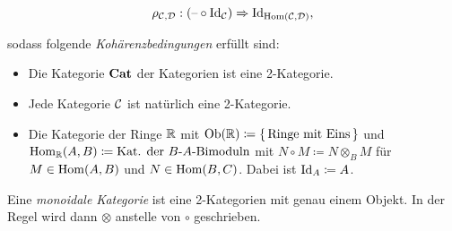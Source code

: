 \documentclass{cheat-sheet}
\newenvironment{centertikzcd}
  {\begin{center}\begin{tikzcd}}
  {\end{tikzcd}\end{center}}
\begin{document}
\begin{defn}
\begin{itemize}
\[      \rho_{\mathcal{C}, \mathcal{D}} : (\text{--} \circ \operatorname{Id}_{\mathcal{C}}) \Rightarrow \operatorname{Id}_{\operatorname{Hom}(\mathcal{C}, \mathcal{D})},
    \]
  \end{itemize}
  sodass folgende \emph{Kohärenzbedingungen} erfüllt sind:
\end{defn}


\begin{bspe}
  \begin{itemize}
    \item Die Kategorie $\mathbf{Cat}$ der Kategorien ist eine 2-Kategorie.
    \item Jede Kategorie $\mathcal{C}$ ist natürlich eine 2-Kategorie.
    \item Die Kategorie der Ringe $\mathbb{R}$ mit $\operatorname{Ob}(\mathbb{R}) \coloneqq \{ \, \text{Ringe mit Eins} \, \}$ und $\operatorname{Hom}_{\mathbb{R}}(A, B) \coloneqq \text{Kat. der $B$-$A$-Bimoduln}$ mit $N \circ M \coloneqq N \otimes_B M$ für $M \in \operatorname{Hom}(A, B)$ und $N \in \operatorname{Hom}(B, C)$. Dabei ist $\operatorname{Id}_A \coloneqq A$. %
  \end{itemize}
\end{bspe}

\begin{defn}
  Eine \emph{monoidale Kategorie} ist eine 2-Kategorien mit genau einem Objekt.
  In der Regel wird dann $\otimes$ anstelle von $\circ$ geschrieben.
\end{defn}
\end{document}
